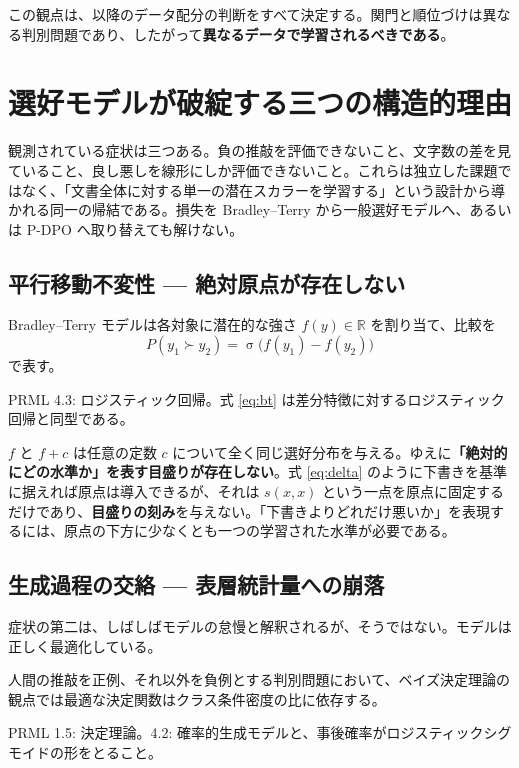 \documentclass[a4paper,10.5pt]{ltjsarticle}
\newcommand{\prml}[1]{%
  \par\vspace{5pt}%
  \noindent\hspace*{1.6em}%
  \begin{minipage}{\dimexpr\linewidth-3.2em\relax}
    \color{black!55}\sffamily\footnotesize #1
  \end{minipage}%
  \par\vspace{6pt}}
\newcommand{\sg}{\operatorname{\sigma}}
\begin{document}
この観点は、以降のデータ配分の判断をすべて決定する。関門と順位づけは異なる判別問題であり、したがって\textbf{異なるデータで学習されるべきである}。

\section{選好モデルが破綻する三つの構造的理由}

観測されている症状は三つある。負の推敲を評価できないこと、文字数の差を見ていること、良し悪しを線形にしか評価できないこと。これらは独立した課題ではなく、「文書全体に対する単一の潜在スカラーを学習する」という設計から導かれる同一の帰結である。損失を Bradley--Terry から一般選好モデルへ、あるいは P-DPO へ取り替えても解けない。

\subsection{平行移動不変性 --- 絶対原点が存在しない}

Bradley--Terry モデルは各対象に潜在的な強さ $f(y) \in \mathbb{R}$ を割り当て、比較を
\begin{equation}
  P(y_1 \succ y_2) = \sg\!\bigl(f(y_1) - f(y_2)\bigr)
  \label{eq:bt}
\end{equation}
で表す。

\prml{PRML 4.3: ロジスティック回帰。式 \eqref{eq:bt} は差分特徴に対するロジスティック回帰と同型である。}

$f$ と $f + c$ は任意の定数 $c$ について全く同じ選好分布を与える。ゆえに\textbf{「絶対的にどの水準か」を表す目盛りが存在しない}。式 \eqref{eq:delta} のように下書きを基準に据えれば原点は導入できるが、それは $s(x,x)$ という一点を原点に固定するだけであり、\textbf{目盛りの刻み}を与えない。「下書きよりどれだけ悪いか」を表現するには、原点の下方に少なくとも一つの学習された水準が必要である。

\subsection{生成過程の交絡 --- 表層統計量への崩落}

症状の第二は、しばしばモデルの怠慢と解釈されるが、そうではない。モデルは正しく最適化している。

人間の推敲を正例、それ以外を負例とする判別問題において、ベイズ決定理論の観点では最適な決定関数はクラス条件密度の比に依存する。

\prml{PRML 1.5: 決定理論。4.2: 確率的生成モデルと、事後確率がロジスティックシグモイドの形をとること。}
\end{document}
